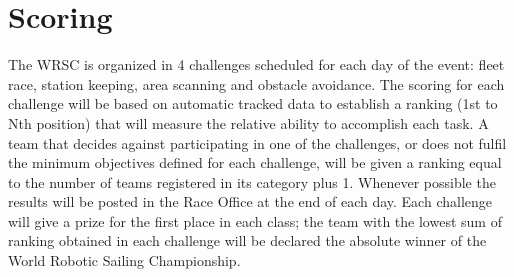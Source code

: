 \documentclass[12pt]{article}
\begin{document}
\section{Scoring}

The WRSC is organized in 4 challenges scheduled for each day of the event: fleet
race, station keeping, area scanning and obstacle avoidance. The scoring for each 
challenge will be based on automatic tracked data to establish a ranking 
(1st to Nth position) that will measure the relative
ability to accomplish each task. A team that decides against participating in
one of the challenges, or does not fulfil the minimum objectives defined for
each challenge, will be given a ranking equal to the number of teams registered 
in its category plus 1. Whenever possible
the results will be posted in the Race Office at the end of each day.
Each challenge will give a prize for the first place in each class; the team
with the lowest sum of ranking obtained in each challenge will be declared the
absolute winner of the World Robotic Sailing Championship.
\end{document}
